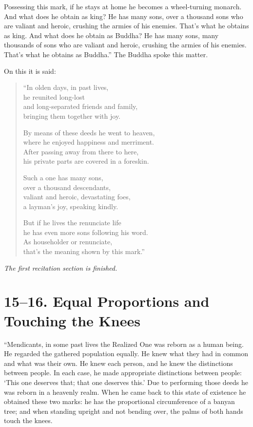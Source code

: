 \documentclass[12pt,openany]{book}%
\newcommand*{\scendsection}[1]{\begin{center}\textit{#1}\end{center}}
\begin{document}
Possessing this mark, if he stays at home he becomes a wheel-turning monarch. And what does he obtain as king? He has many sons, over a thousand sons who are valiant and heroic, crushing the armies of his enemies. That’s what he obtains as king. And what does he obtain as Buddha? He has many sons, many thousands of sons who are valiant and heroic, crushing the armies of his enemies. That’s what he obtains as Buddha.” The Buddha spoke this matter. 

On this it is said: 

\begin{verse}%
“In olden days, in past lives, \\
he reunited long-lost \\
and long-separated friends and family, \\
bringing them together with joy. 

By means of these deeds he went to heaven, \\
where he enjoyed happiness and merriment. \\
After passing away from there to here, \\
his private parts are covered in a foreskin. 

Such a one has many sons, \\
over a thousand descendants, \\
valiant and heroic, devastating foes, \\
a layman’s joy, speaking kindly. 

But if he lives the renunciate life \\
he has even more sons following his word. \\
As householder or renunciate, \\
that’s the meaning shown by this mark.” 

%
\end{verse}

\scendsection{The first recitation section is finished. }

\section*{15–16. Equal Proportions and Touching the Knees }

“Mendicants, in some past lives the Realized One was reborn as a human being. He regarded the gathered population equally. He knew what they had in common and what was their own. He knew each person, and he knew the distinctions between people. In each case, he made appropriate distinctions between people: ‘This one deserves that; that one deserves this.’ Due to performing those deeds he was reborn in a heavenly realm. When he came back to this state of existence he obtained these two marks: he has the proportional circumference of a banyan tree; and when standing upright and not bending over, the palms of both hands touch the knees. 
\end{document}
